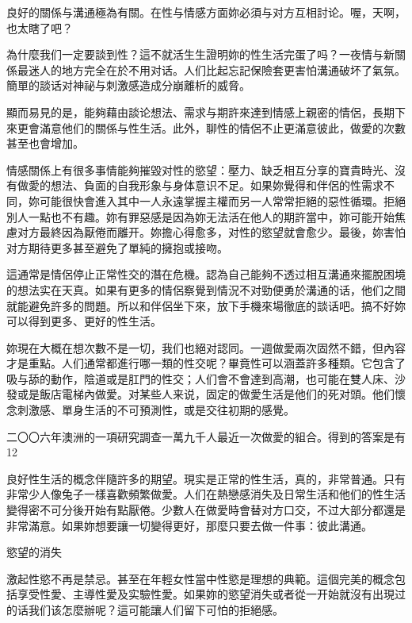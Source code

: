 \documentclass[12pt,UTF8]{ctexbook}
\begin{document}
良好的關係与溝通極為有關。在性与情感方面妳必須与对方互相討论。喔，天啊，也太瞎了吧？

為什麼我们一定要談到性？這不就活生生證明妳的性生活完蛋了吗？一夜情与新關係最迷人的地方完全在於不用对话。人们比起忘記保險套更害怕溝通破坏了氣氛。簡單的談话对神祕与刺激感造成分崩離析的威脅。

顯而易見的是，能夠藉由談论想法、需求与期許來達到情感上親密的情侶，長期下來更會滿意他们的關係与性生活。此外，聊性的情侶不止更滿意彼此，做愛的次數甚至也會增加。

情感關係上有很多事情能夠摧毀对性的慾望：壓力、缺乏相互分享的寶貴時光、沒有做愛的想法、負面的自我形象与身体意识不足。如果妳覺得和伴侶的性需求不同，妳可能很快會進入其中一人永遠掌握主權而另一人常常拒絕的惡性循環。拒絕別人一點也不有趣。妳有罪惡感是因為妳无法活在他人的期許當中，妳可能开始焦慮对方最終因為厭倦而離开。妳擔心得愈多，对性的慾望就會愈少。最後，妳害怕对方期待更多甚至避免了單純的擁抱或接吻。

這通常是情侶停止正常性交的潛在危機。認為自己能夠不透过相互溝通來擺脫困境的想法实在天真。如果有更多的情侶察覺到情況不对勁便勇於溝通的话，他们之間就能避免許多的問題。所以和伴侶坐下來，放下手機來場徹底的談话吧。搞不好妳可以得到更多、更好的性生活。

妳現在大概在想次數不是一切，我们也絕对認同。一週做愛兩次固然不錯，但內容才是重點。人们通常都進行哪一類的性交呢？畢竟性可以涵蓋許多種類。它包含了吸与舔的動作，陰道或是肛門的性交；人们會不會達到高潮，也可能在雙人床、沙發或是飯店電梯內做愛。对某些人来说，固定的做愛生活是他们的死对頭。他们懷念刺激感、單身生活的不可預測性，或是交往初期的感覺。

二〇〇六年澳洲的一項研究調查一萬九千人最近一次做愛的組合。得到的答案是有12%

良好性生活的概念伴隨許多的期望。現实是正常的性生活，真的，非常普通。只有非常少人像兔子一樣喜歡頻繁做愛。人们在熱戀感消失及日常生活和他们的性生活變得密不可分後开始有點厭倦。少數人在做愛時會替对方口交，不过大部分都還是非常滿意。如果妳想要讓一切變得更好，那麼只要去做一件事：彼此溝通。





慾望的消失




激起性慾不再是禁忌。甚至在年輕女性當中性慾是理想的典範。這個完美的概念包括享受性愛、主導性愛及实驗性愛。如果妳的慾望消失或者從一开始就沒有出現过的话我们该怎麼辦呢？這可能讓人们留下可怕的拒絕感。
\end{document}
